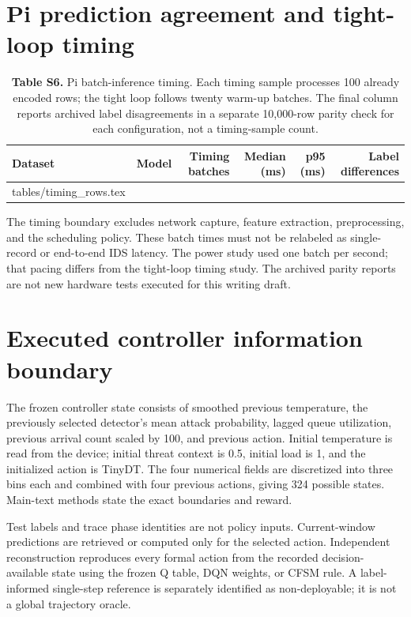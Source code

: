 \documentclass[10pt,a4paper]{article}
\makeatletter
\newcommand{\tableinput}[1]{\@@input #1.tex }
\makeatother
\begin{document}
\clearpage
\section{Pi prediction agreement and tight-loop timing}
\begin{table}[h!]
\centering\small
\caption*{\textbf{Table S6.} Pi batch-inference timing. Each timing sample processes 100 already encoded rows; the tight loop follows twenty warm-up batches. The final column reports archived label disagreements in a separate 10,000-row parity check for each configuration, not a timing-sample count.}
\begin{tabular}{llrrrr}\toprule
Dataset & Model & Timing batches & Median (ms) & p95 (ms) & Label differences\\\midrule
\tableinput{tables/timing_rows}
\bottomrule\end{tabular}
\end{table}
The timing boundary excludes network capture, feature extraction, preprocessing, and the scheduling policy. These batch times must not be relabeled as single-record or end-to-end IDS latency. The power study used one batch per second; that pacing differs from the tight-loop timing study. The archived parity reports are not new hardware tests executed for this writing draft.

\section{Executed controller information boundary}
The frozen controller state consists of smoothed previous temperature, the previously selected detector's mean attack probability, lagged queue utilization, previous arrival count scaled by 100, and previous action. Initial temperature is read from the device; initial threat context is 0.5, initial load is 1, and the initialized action is TinyDT. The four numerical fields are discretized into three bins each and combined with four previous actions, giving 324 possible states. Main-text methods state the exact boundaries and reward.

Test labels and trace phase identities are not policy inputs. Current-window predictions are retrieved or computed only for the selected action. Independent reconstruction reproduces every formal action from the recorded decision-available state using the frozen Q table, DQN weights, or CFSM rule. A label-informed single-step reference is separately identified as non-deployable; it is not a global trajectory oracle.
\end{document}
